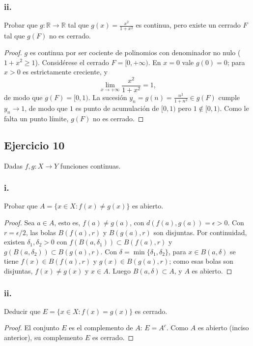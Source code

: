 \documentclass[11pt, a4paper]{article}
\begin{document}
\subsubsection*{ii.}
Probar que $g: \mathbb{R} \to \mathbb{R}$ tal que $g(x) = \frac{x^2}{1+x^2}$ es continua, pero
existe un cerrado $F$ tal que $g(F)$ no es cerrado.

\begin{proof}
$g$ es continua por ser cociente de polinomios con denominador no nulo ($1 + x^2 \ge 1$). Considérese
el cerrado $F = [0, +\infty)$. En $x = 0$ vale $g(0) = 0$; para $x > 0$ es estrictamente creciente, y
$$ \lim_{x \to +\infty} \frac{x^2}{1+x^2} = 1, $$
de modo que $g(F) = [0, 1)$. La sucesión $y_n = g(n) = \frac{n^2}{1+n^2} \in g(F)$ cumple $y_n \to 1$, de
modo que $1$ es punto de acumulación de $[0, 1)$ pero $1 \notin [0, 1)$. Como le falta un punto
límite, $g(F)$ no es cerrado.
\end{proof}

\subsection*{Ejercicio 10}

Dadas $f, g: X \to Y$ funciones continuas.

\subsubsection*{i.}
Probar que $A = \{x \in X : f(x) \neq g(x)\}$ es abierto.

\begin{proof}
Sea $a \in A$, esto es, $f(a) \neq g(a)$, con $d(f(a), g(a)) = \epsilon > 0$. Con $r = \epsilon/2$,
las bolas $B(f(a), r)$ y $B(g(a), r)$ son disjuntas. Por continuidad, existen
$\delta_1, \delta_2 > 0$ con $f(B(a, \delta_1)) \subset B(f(a), r)$ y
$g(B(a, \delta_2)) \subset B(g(a), r)$. Con $\delta = \min\{\delta_1, \delta_2\}$, para
$x \in B(a, \delta)$ se tiene $f(x) \in B(f(a), r)$ y $g(x) \in B(g(a), r)$; como esas bolas son
disjuntas, $f(x) \neq g(x)$ y $x \in A$. Luego $B(a, \delta) \subset A$, y $A$ es abierto.
\end{proof}

\subsubsection*{ii.}
Deducir que $E = \{x \in X : f(x) = g(x)\}$ es cerrado.

\begin{proof}
El conjunto $E$ es el complemento de $A$: $E = A^c$. Como $A$ es abierto (inciso anterior), su
complemento $E$ es cerrado.
\end{proof}
\end{document}
